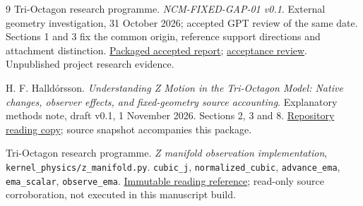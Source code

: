 \begin{thebibliography}{9}
Tri-Octagon research programme.
\emph{NCM-FIXED-GAP-01 v0.1}.
External geometry investigation, 31 October 2026; accepted GPT review of the same date.
Sections 1 and 3 fix the common origin, reference support directions and attachment distinction.
\href{provenance/primary/fixed_gap_report.md}{Packaged accepted report};
\href{provenance/primary/fixed_gap_review.md}{acceptance review}.
Unpublished project research evidence.

H. F. Halld\'orsson.
\emph{Understanding Z Motion in the Tri-Octagon Model: Native changes, observer effects, and fixed-geometry source accounting}.
Explanatory methods note, draft v0.1, 1 November 2026.
Sections 2, 3 and 8.
\href{https://github.com/pzychozen/trioctagon-physics/blob/634ff13b666604d5caed11cc3731dcb5a863ff6c/docs/methods/Z_MOTION/v0.1/manuscript/NOTE.md}{Repository reading copy}; source snapshot accompanies this package.

Tri-Octagon research programme.
\emph{Z manifold observation implementation}, \texttt{kernel\_physics/z\_manifold.py}.
\texttt{cubic\_j}, \texttt{normalized\_cubic}, \texttt{advance\_ema}, \texttt{ema\_scalar}, \texttt{observe\_ema}.
\href{https://github.com/pzychozen/trioctagon-physics/blob/634ff13b666604d5caed11cc3731dcb5a863ff6c/kernel_physics/z_manifold.py}{Immutable reading reference}; read-only source corroboration, not executed in this manuscript build.
\end{thebibliography}
